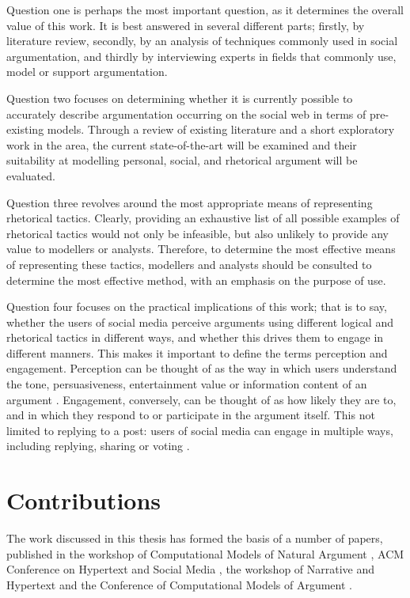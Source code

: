 Question one is perhaps the most important question, as it determines the overall value of this work. It is best answered in several different parts; firstly, by literature review, secondly, by an analysis of techniques commonly used in social argumentation, and thirdly by interviewing experts in fields that commonly use, model or support argumentation.

Question two focuses on determining whether it is currently possible to accurately describe argumentation occurring on the social web in terms of pre-existing models. Through a review of existing literature and a short exploratory work in the area, the current state-of-the-art will be examined and their suitability at modelling personal, social, and rhetorical argument will be evaluated.

Question three revolves around the most appropriate means of representing rhetorical tactics. Clearly, providing an exhaustive list of all possible examples of rhetorical tactics would not only be infeasible, but also unlikely to provide any value to modellers or analysts. Therefore, to determine the most effective means of representing these tactics, modellers and analysts should be consulted to determine the most effective method, with an emphasis on the purpose of use.

Question four focuses on the practical implications of this work; that is to say, whether the users of social media perceive arguments using different logical and rhetorical tactics in different ways, and whether this drives them to engage in different manners. This makes it important to define the terms perception and engagement. Perception can be thought of as the way in which users understand the tone, persuasiveness, entertainment value or information content of an argument \citep{sundar2000}. Engagement, conversely, can be thought of as how likely they are to, and in which they respond to or participate in the argument itself. This not limited to replying to a post: users of social media can engage in multiple ways, including replying, sharing or voting \citep{markova2013}.


\section{Contributions}
The work discussed in this thesis has formed the basis of a number of papers, published in the workshop of Computational Models of Natural Argument \citep{Blount2014}, ACM Conference on Hypertext and Social Media \citep{Blount2015}, the workshop of Narrative and Hypertext \citep{Blount2015role} and the Conference of Computational Models of Argument \citep{Blount2016rhetorical}.

